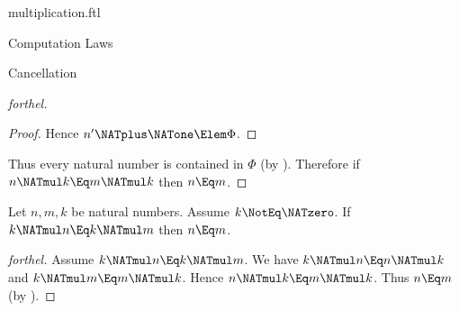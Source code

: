 \documentclass{stex}
\begin{document}
\begin{smodule}{multiplication.ftl}
\begin{sfragment}{Computation Laws}
\begin{sfragment}{Cancellation}
\begin{proof}[forthel]
\begin{proof}
        Hence $n' \NATplus \NATone \Elem \Phi$.
      \end{proof}

      Thus every natural number is contained in $\Phi$ (by ).
      Therefore if $n \NATmul k \Eq m \NATmul k$ then $n \Eq m$.
    \end{proof}


    \begin{corollary}[forthel,name=left-cancellability of multiplication]
      Let $n, m, k$ be natural numbers.
      Assume $k \NotEq \NATzero$.
      If $k \NATmul n \Eq k \NATmul m$ then $n \Eq m$.
    \end{corollary}
    \begin{proof}[forthel]
      Assume $k \NATmul n \Eq k \NATmul m$.
      We have $k \NATmul n \Eq n \NATmul k$ and $k \NATmul m \Eq m \NATmul k$.
      Hence $n \NATmul k \Eq m \NATmul k$.
      Thus $n \Eq m$ (by ).
    \end{proof}
  \end{sfragment}
\end{sfragment}
\end{smodule}
\end{document}
